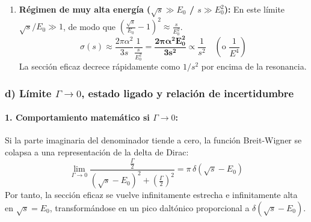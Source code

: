 \begin{problema}
\begin{enumerate}[label=\arabic*.]
    \item \textbf{Régimen de muy alta energía ($\sqrt{s} \gg E_0$ / $s \gg E_0^2$):}
    En este límite $\sqrt{s}/E_0 \gg 1$, de modo que $\left( \frac{\sqrt{s}}{E_0} - 1 \right)^2 \approx \frac{s}{E_0^2}$.
    \begin{equation*}
    \sigma(s) \approx \frac{2\pi\alpha^2}{3s} \frac{1}{\frac{s}{E_0^2}} = \mathbf{\frac{2\pi\alpha^2 E_0^2}{3 s^2}} \propto \frac{1}{s^2} \quad \left( \text{o } \frac{1}{E^4} \right)
    \end{equation*}
    La sección eficaz decrece rápidamente como $1/s^2$ por encima de la resonancia.
\end{enumerate}

\subsubsection*{d) Límite $\Gamma \to 0$, estado ligado y relación de incertidumbre}

\paragraph{1. Comportamiento matemático si $\Gamma \to 0$:}
Si la parte imaginaria del denominador tiende a cero, la función Breit-Wigner se colapsa a una representación de la delta de Dirac:
\begin{equation*}
\lim_{\Gamma \to 0} \frac{\frac{\Gamma}{2}}{(\sqrt{s} - E_0)^2 + \left(\frac{\Gamma}{2}\right)^2} = \pi \, \delta(\sqrt{s} - E_0)
\end{equation*}
Por tanto, la sección eficaz se vuelve infinitamente estrecha e infinitamente alta en $\sqrt{s} = E_0$, transformándose en un pico daltónico proporcional a $\delta(\sqrt{s} - E_0)$.


\end{problema}
